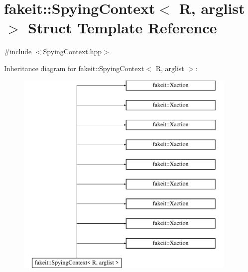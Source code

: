 \hypertarget{structfakeit_1_1SpyingContext}{}\section{fakeit\+::Spying\+Context$<$ R, arglist $>$ Struct Template Reference}
\label{structfakeit_1_1SpyingContext}


{\ttfamily \#include $<$Spying\+Context.\+hpp$>$}

Inheritance diagram for fakeit\+::Spying\+Context$<$ R, arglist $>$\+:\begin{figure}[H]
\begin{center}
\leavevmode
\includegraphics[height=10.000000cm]{structfakeit_1_1SpyingContext}
\end{center}
\end{figure}
